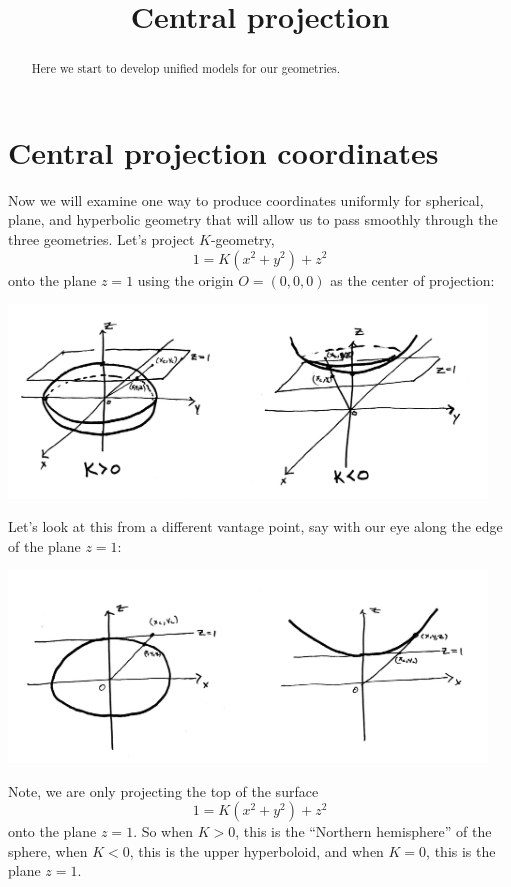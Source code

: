 \documentclass{ximera}
\title{Central projection}
\begin{document}
\begin{abstract}
Here we start to develop unified models for our geometries.
\end{abstract}
\maketitle

\section{Central projection coordinates}

Now we will examine one way to produce coordinates uniformly for spherical, plane, and hyperbolic geometry that will allow us to pass smoothly through the three geometries. Let's project $K$-geometry,
\[
1=K\left(x^{2}+y^{2}\right)+z^{2} 
\]
onto the plane $z=1$ using the origin $O=(0,0,0)$ as the center of
projection:
\begin{image}
\includegraphics[width=5in]{KGeomCentralProjection.png}
\end{image}
Let's look at this from a different vantage point, say with our eye
along the edge of the plane $z=1$:
\begin{image}
\includegraphics[width=5in]{2dCentralProjection.png}
\end{image}
Note, we are only projecting the top of the surface
\[
1=K\left(x^{2}+y^{2}\right)+z^{2} 
\]
onto the plane $z=1$. So when $K>0$, this is the ``Northern hemisphere'' of
the sphere, when $K<0$, this is the upper hyperboloid, and when $K=0$,
this is the plane $z=1$.
\end{document}
